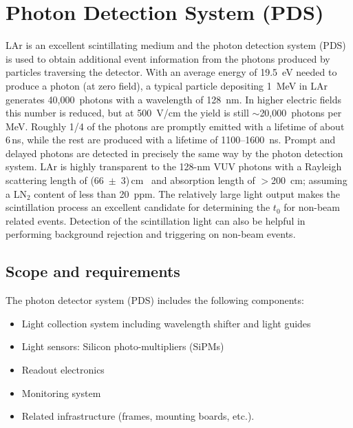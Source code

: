 
\section{Photon Detection System (PDS)}
\label{sec:pd_system}

LAr is an excellent scintillating medium and the photon detection
system (PDS) is used to obtain additional event information from
the photons produced by particles traversing the detector.
 With an
average energy of 19.5~eV needed to produce a photon (at zero field),
a typical particle depositing 1~MeV in LAr generates
40,000~photons with a wavelength of 128~nm. In higher electric fields this number is 
reduced, but at 500~V/cm the yield is still $\sim$20,000~photons
per MeV. Roughly 1/4 of the photons are promptly emitted with a
lifetime of about 6\,ns, while the rest are produced with a lifetime of
1100--1600~ns. Prompt and delayed photons are detected in
  precisely the same way by the photon detection system. LAr is
highly transparent to the 128-nm VUV photons with a Rayleigh
scattering length of (66~$\pm$~3)\,cm~\cite{Rayleigh} 
and absorption
length of $>$200~cm; assuming a LN$_2$
  content of less than 20~ppm. The relatively large light output makes
the scintillation process an excellent candidate for determining the
$t_0$ for non-beam related events. Detection of the scintillation
light can also be helpful in performing background rejection and triggering on
non-beam events.

\subsection{Scope and requirements}

The photon detector system (PDS) 
includes the following components:

\begin{itemize}
\item Light collection system including wavelength shifter and light guides
\item Light sensors: Silicon photo-multipliers (SiPMs)
\item Readout electronics
\item Monitoring system
\item Related infrastructure (frames, mounting boards, etc.).
\end{itemize}


